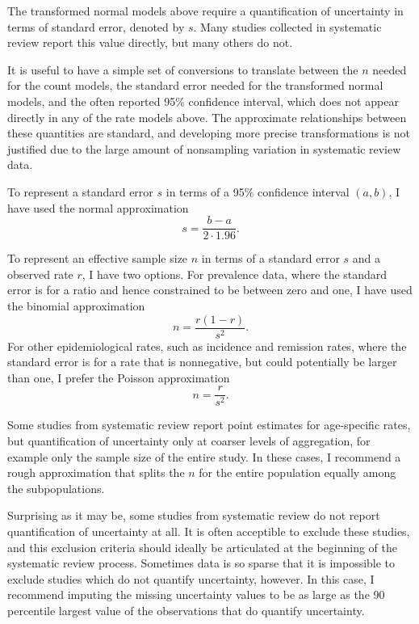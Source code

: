 The transformed normal models above require a quantification of
uncertainty in terms of standard error, denoted by $s$.  Many studies
collected in systematic review report this value directly, but many
others do not.

It is useful to have a simple set of conversions to translate between
the $n$ needed for the count models, the standard error needed for the
transformed normal models, and the often reported 95\% confidence
interval, which does not appear directly in any of the rate models
above. The approximate relationships between these quantities are
standard, and developing more precise transformations is not justified
due to the large amount of nonsampling variation in systematic review
data.

To represent a standard error $s$ in terms of a 95\% confidence
interval $(a,b)$, I have used the normal approximation
\[
s = \frac{b-a}{2\cdot 1.96}.
\]

To represent an effective sample size $n$ in terms of a standard error
$s$ and a observed rate $r$, I have two options.  For prevalence data,
where the standard error is for a ratio and hence constrained to be
between zero and one, I have used the binomial approximation
\[
n = \frac{r(1-r)}{s^2}.
\]
For other epidemiological rates, such as incidence and remission
rates, where the standard error is for a rate that is nonnegative, but
could potentially be larger than one, I prefer the Poisson
approximation
\[
n = \frac{r}{s^2}.
\]

Some studies from systematic review report point estimates for
age-specific rates, but quantification of uncertainty only at coarser
levels of aggregation, for example only the sample size of the entire
study.  In these cases, I recommend a rough approximation that splits
the $n$ for the entire population equally among the subpopulations.

Surprising as it may be, some studies from systematic review do not
report quantification of uncertainty at all.  It is often acceptible
to exclude these studies, and this exclusion criteria should ideally
be articulated at the beginning of the systematic review process.
Sometimes data is so sparse that it is impossible to exclude studies
which do not quantify uncertainty, however.  In this case, I recommend
imputing the missing uncertainty values to be as large as the 90
percentile largest value of the observations that do quantify
uncertainty.



